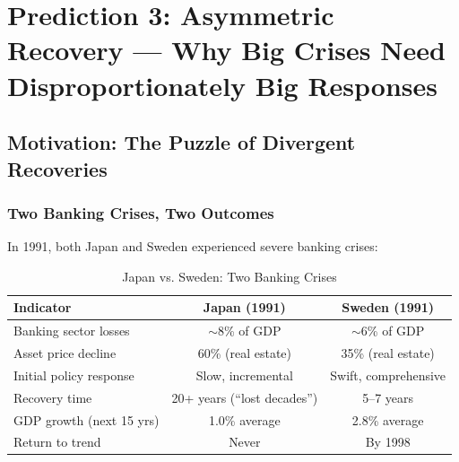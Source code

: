 \section{Prediction 3: Asymmetric Recovery --- Why Big Crises Need Disproportionately Big Responses}
\label{app:prediction-asymmetric}


\begin{abstract}
This appendix provides the complete technical foundation for Prediction 3 of the 
Complementarity-Context Framework: that recovery from coherence shocks is fundamentally 
asymmetric---small shocks recover quickly, large shocks recover slowly or not at all.
We develop the formal model of convex restoration costs, derive the critical coherence 
threshold $\underline{K}$, validate against historical recovery data (Japan's lost 
decades vs. Nordic recoveries), and establish the ``big push'' principle for crisis 
response. The analysis explains why similar policy interventions produce dramatically 
different outcomes depending on crisis severity.
\end{abstract}

\subsection{Motivation: The Puzzle of Divergent Recoveries}

\subsubsection{Two Banking Crises, Two Outcomes}

In 1991, both Japan and Sweden experienced severe banking crises:

\begin{table}[htbp]
\centering
\caption{Japan vs. Sweden: Two Banking Crises}
\label{tab:japan-sweden}
\begin{tabular}{@{}lcc@{}}
\toprule
\textbf{Indicator} & \textbf{Japan (1991)} & \textbf{Sweden (1991)} \\
\midrule
Banking sector losses & $\sim$8\% of GDP & $\sim$6\% of GDP \\
Asset price decline & 60\% (real estate) & 35\% (real estate) \\
Initial policy response & Slow, incremental & Swift, comprehensive \\
\midrule
Recovery time & 20+ years (``lost decades'') & 5--7 years \\
GDP growth (next 15 yrs) & 1.0\% average & 2.8\% average \\
Return to trend & Never & By 1998 \\
\bottomrule
\end{tabular}
\end{table}

